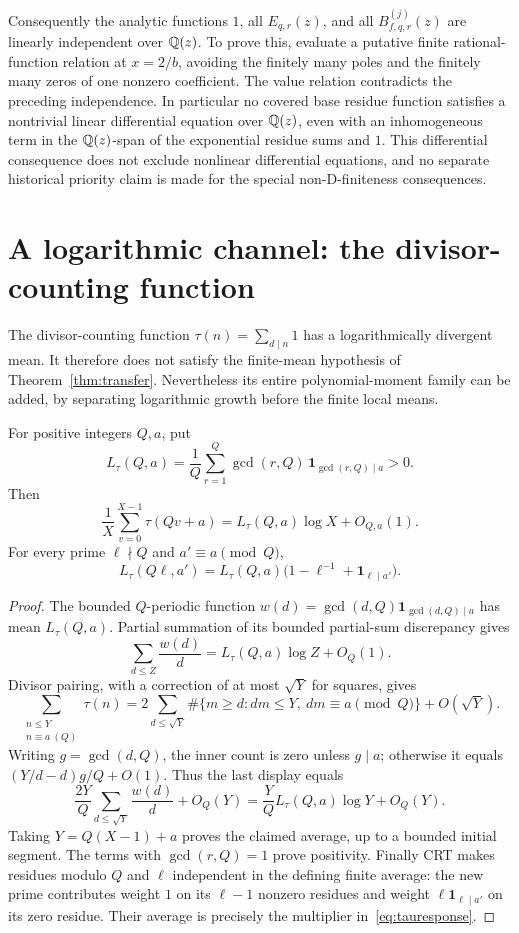 Consequently the analytic functions $1$, all $E_{q,r}(z)$, and all
$B_{f,q,r}^{(j)}(z)$ are linearly independent over $\mathbb Q(z)$.
To prove this, evaluate a putative finite rational-function relation at
$x=2/b$, avoiding the finitely many poles and the finitely many zeros
of one nonzero coefficient. The value relation contradicts the
preceding independence. In particular no covered base residue function
satisfies a nontrivial linear differential equation over $\mathbb Q(z)$,
even with an inhomogeneous term in the $\mathbb Q(z)$-span of the exponential
residue sums and $1$. This differential consequence does not exclude
nonlinear differential equations, and no separate historical priority
claim is made for the special non-D-finiteness consequences.


\section{A logarithmic channel: the divisor-counting function}
\label{sec:tauchannel}
The divisor-counting function $\tau(n)=\sum_{d\mid n}1$ has a logarithmically
divergent mean. It therefore does not satisfy the finite-mean hypothesis of
Theorem~\ref{thm:transfer}. Nevertheless its entire polynomial-moment family
can be added, by separating logarithmic growth before the finite local means.

\begin{lemma}\label{lem:taumean}
For positive integers $Q,a$, put
\[
 L_\tau(Q,a)=\frac1Q\sum_{r=1}^Q
       \gcd(r,Q)\,\mathbf1_{\gcd(r,Q)\mid a}>0.
\]
Then
\[
 \frac1X\sum_{v=0}^{X-1}\tau(Qv+a)
       =L_\tau(Q,a)\log X+O_{Q,a}(1).
\]
For every prime $\ell\nmid Q$ and $a'\equiv a\pmod Q$,
\begin{equation}\label{eq:tauresponse}
 L_\tau(Q\ell,a')=L_\tau(Q,a)
      \bigl(1-\ell^{-1}+\mathbf1_{\ell\mid a'}\bigr).
\end{equation}
\end{lemma}
\begin{proof}
The bounded $Q$-periodic function
$w(d)=\gcd(d,Q)\mathbf1_{\gcd(d,Q)\mid a}$ has mean $L_\tau(Q,a)$.
Partial summation of its bounded partial-sum discrepancy gives
\[
 \sum_{d\leq Z}\frac{w(d)}d=L_\tau(Q,a)\log Z+O_Q(1).
\]
Divisor pairing, with a correction of at most $\sqrt Y$ for squares, gives
\[
 \sum_{\substack{n\leq Y\\n\equiv a\ (Q)}}\tau(n)
  =2\sum_{d\leq\sqrt Y}
       \#\{m\geq d:dm\leq Y,\ dm\equiv a\pmod Q\}+O(\sqrt Y).
\]
Writing $g=\gcd(d,Q)$, the inner count is zero unless $g\mid a$;
otherwise it equals $(Y/d-d)g/Q+O(1)$. Thus the last display equals
\[
 \frac{2Y}{Q}\sum_{d\leq\sqrt Y}\frac{w(d)}d+O_Q(Y)
   =\frac YQ L_\tau(Q,a)\log Y+O_Q(Y).
\]
Taking $Y=Q(X-1)+a$ proves the claimed average, up to a bounded initial
segment. The terms with $\gcd(r,Q)=1$ prove positivity. Finally CRT
makes residues modulo $Q$ and $\ell$ independent in the defining finite
average: the new prime contributes weight $1$ on its $\ell-1$ nonzero
residues and weight $\ell\mathbf1_{\ell\mid a'}$ on its zero residue.
Their average is precisely the multiplier in~\eqref{eq:tauresponse}.
\end{proof}

